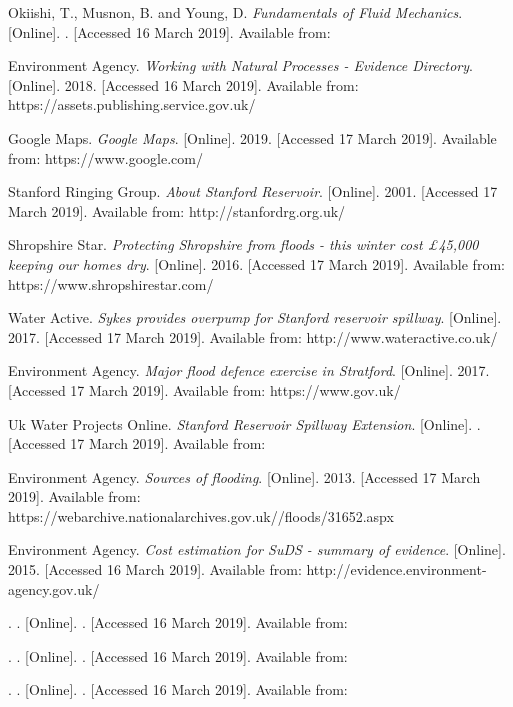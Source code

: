 \documentclass[11pt,a4paper]{article}
\begin{document}
\begin{thebibliography}{}
Okiishi, T., Musnon, B. and Young, D. \textit{Fundamentals of Fluid Mechanics}. [Online]. . [Accessed 16 March 2019]. Available from: 

Environment Agency. \textit{Working with Natural Processes - Evidence Directory}. [Online]. 2018. [Accessed 16 March 2019]. Available from: https://assets.publishing.service.gov.uk/

Google Maps. \textit{Google Maps}. [Online]. 2019. [Accessed 17 March 2019]. Available from: https://www.google.com/

Stanford Ringing Group. \textit{About Stanford Reservoir}. [Online]. 2001. [Accessed 17 March 2019]. Available from: http://stanfordrg.org.uk/

Shropshire Star. \textit{Protecting Shropshire from floods - this winter cost £45,000 keeping our homes dry}. [Online]. 2016. [Accessed 17 March 2019]. Available from: https://www.shropshirestar.com/

Water Active. \textit{Sykes provides overpump for Stanford reservoir spillway}. [Online]. 2017. [Accessed 17 March 2019]. Available from: http://www.wateractive.co.uk/

Environment Agency. \textit{Major flood defence exercise in Stratford}. [Online]. 2017. [Accessed 17 March 2019]. Available from: https://www.gov.uk/

Uk Water Projects Online. \textit{Stanford Reservoir Spillway Extension}. [Online]. . [Accessed 17 March 2019]. Available from:

Environment Agency. \textit{Sources of flooding}. [Online]. 2013. [Accessed 17 March 2019]. Available from: https://webarchive.nationalarchives.gov.uk//floods/31652.aspx

Environment Agency. \textit{Cost estimation for SuDS - summary of evidence}. [Online]. 2015. [Accessed 16 March 2019]. Available from: http://evidence.environment-agency.gov.uk/

\bibitem{}
. \textit{}. [Online]. . [Accessed 16 March 2019]. Available from:

\bibitem{}
. \textit{}. [Online]. . [Accessed 16 March 2019]. Available from:

\bibitem{}
. \textit{}. [Online]. . [Accessed 16 March 2019]. Available from:
\end{thebibliography}


\newpage
\appendix
\end{document}
